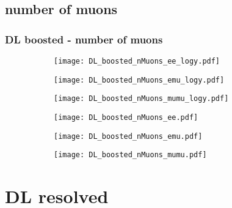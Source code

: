 \documentclass[aspectratio=169,8pt]{beamer}
\begin{document}
\subsection{number of muons}
\begin{frame}
\frametitle{DL boosted - number of muons}
\begin{figure}
\captionsetup[subfigure]{labelformat=empty}
\begin{subfigure}{0.32\textwidth}
\texttt{[image: DL\_boosted\_nMuons\_ee\_logy.pdf]}
\vspace*{-0.15cm}
\end{subfigure}
\hfil
\begin{subfigure}{0.32\textwidth}
\texttt{[image: DL\_boosted\_nMuons\_emu\_logy.pdf]}
\vspace*{-0.15cm}
\end{subfigure}
\hfil
\begin{subfigure}{0.32\textwidth}
\texttt{[image: DL\_boosted\_nMuons\_mumu\_logy.pdf]}
\vspace*{-0.15cm}
\end{subfigure}
\hfil
\begin{subfigure}{0.32\textwidth}
\texttt{[image: DL\_boosted\_nMuons\_ee.pdf]}
\vspace*{-0.15cm}
\end{subfigure}
\hfil
\begin{subfigure}{0.32\textwidth}
\texttt{[image: DL\_boosted\_nMuons\_emu.pdf]}
\vspace*{-0.15cm}
\end{subfigure}
\hfil
\begin{subfigure}{0.32\textwidth}
\texttt{[image: DL\_boosted\_nMuons\_mumu.pdf]}
\vspace*{-0.15cm}
\end{subfigure}
\hfil
\end{figure}
\end{frame}
\newpage



\section{DL resolved}
\end{document}
